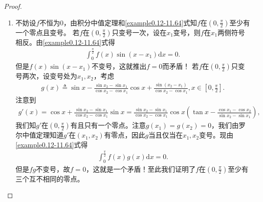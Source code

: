 \documentclass[../../main.tex]{subfiles}
\begin{document}
\begin{proof}
\begin{enumerate}
\item 不妨设$f$不恒为$0$，由积分中值定理和\eqref{example0.12-11.64}式知$f$在$(0,\frac{\pi}{2})$至少有一个零点且变号。
若$f$在$(0,\frac{\pi}{2})$只变号一次，设在$x_1$变号，则$f$在$x_1$两侧符号相反。由\eqref{example0.12-11.64}式得
\begin{align*}
\int_0^{\frac{\pi}{2}} f(x)\sin(x - x_1)\mathrm{d}x = 0.
\end{align*}
但是$f(x)\sin(x - x_1)$不变号，这就推出$f = 0$而矛盾！
若$f$在$(0,\frac{\pi}{2})$只变号两次，设变号处为$x_1,x_2$，考虑
\begin{align*}
g(x)\triangleq\sin x - \frac{\sin x_2 - \sin x_1}{\cos x_2 - \cos x_1}\cos x + \frac{\sin(x_2 - x_1)}{\cos x_2 - \cos x_1},x\in[0,\frac{\pi}{2}].
\end{align*}
注意到
\begin{align*}
g'(x)=\cos x + \frac{\sin x_2 - \sin x_1}{\cos x_2 - \cos x_1}\sin x = \frac{\sin x_2 - \sin x_1}{\cos x_2 - \cos x_1}\cos x\left(\tan x - \frac{\cos x_1 - \cos x_2}{\sin x_2 - \sin x_1}\right),
\end{align*}
我们知$g'$在$(0,\frac{\pi}{2})$有且只有一个零点。注意$g(x_1)=g(x_2)=0$，我们由罗尔中值定理知道$g'$在$(x_1,x_2)$有零点，因此$g$当且仅当在$x_1,x_2$变号。现由\eqref{example0.12-11.64}式得
\begin{align*}
\int_0^{\frac{\pi}{2}} f(x)g(x)\mathrm{d}x = 0.
\end{align*}
但是$fg$不变号，故$f = 0$，这就是一个矛盾！至此我们证明了$f$在$(0,\frac{\pi}{2})$至少有三个互不相同的零点。 
\end{enumerate}
\end{proof}
\end{document}
